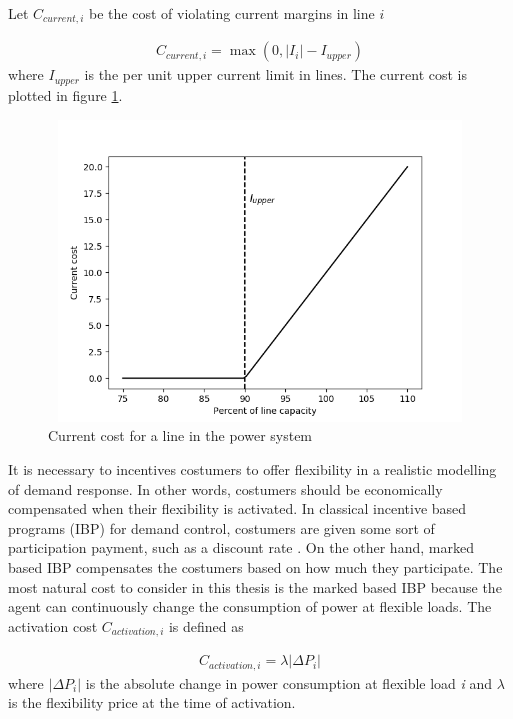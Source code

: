 \documentclass[class=book, crop=false]{standalone}
\begin{document}
Let $C_{current,i}$ be the cost of violating current margins in line $i$

\begin{equation}
   \begin{aligned}
   \label{eq:problem:current_margins_cost}
    C_{current,i} = \max(0,|I_{i}| - I_{upper})
    \end{aligned} 
\end{equation}
where $I_{upper}$ is the per unit upper current limit in lines. The current cost is plotted in figure  \ref{fig:problem:current_cost}.

\begin{figure}[ht]
    \center
\includegraphics[height=8cm, width=12cm]{figures/current_cost.png}
    \caption[size = 9]{Current cost for a line in the power system}
    \label{fig:problem:current_cost}
\end{figure}

It is necessary to incentives costumers to offer flexibility in a realistic modelling of demand response. In other words, costumers should be economically compensated when their flexibility is activated. In classical incentive based programs (IBP) for demand control, costumers are given some sort of participation payment, such as a discount rate \cite{demand_response_definition}. On the other hand, marked based IBP compensates the costumers based on how much they participate. The most natural cost to consider in this thesis is the marked based IBP because the agent can continuously change the consumption of power at flexible loads. The activation cost $C_{activation,i}$ is defined as

\begin{equation}
   \begin{aligned}
   \label{eq:problem:activation_cost}
    C_{activation,i} = \lambda |\Delta P_{i}|
    \end{aligned} 
\end{equation}
where $|\Delta P_{i}|$  is the absolute change in power consumption at flexible load \textit{i} and $\lambda$ is the flexibility price at the time of activation.
\end{document}
